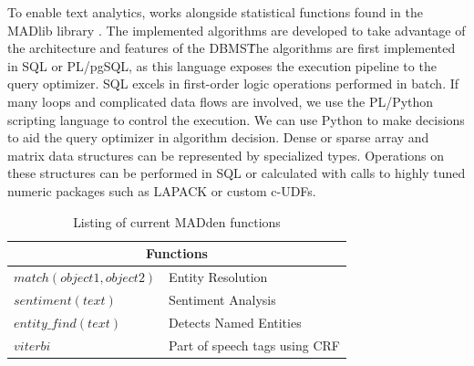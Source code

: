 






To enable text analytics, {\system} works alongside statistical
functions found in the MADlib library \cite{hellerstein2012madlib}.
The implemented algorithms are developed to take advantage of the 
architecture and features of the DBMS\. 
The algorithms are first implemented in SQL or PL/pgSQL, as this language
exposes the execution pipeline to the query optimizer. 
SQL excels in first-order logic operations performed in batch.
If many loops and complicated data flows are involved, we use the PL/Python 
scripting language to control the execution.
We can use Python to make decisions to aid the query optimizer in algorithm
decision.
Dense or sparse array and matrix data structures can be represented
by specialized types. Operations on these structures can be performed in
SQL or calculated with calls to highly tuned numeric packages such as LAPACK
or custom c-UDFs.


\begin{table} 
\begin{center} 
\begin{tabular}{|l|l|} 
\hline 
\multicolumn{2}{|c|}{Functions}\\ 
\hline 
$match(object1, object2)$ & Entity Resolution\\ 
\hline 
$sentiment(text)$ & Sentiment Analysis\\ 
\hline 
$entity\_find(text)$ & Detects Named Entities\\ 
\hline 
$viterbi$ & Part of speech tags using CRF  \\ 
\hline 
\end{tabular} 
\end{center} 
\caption{Listing of current MADden functions} 
\label{tab:madfunct} 
\end{table} 




